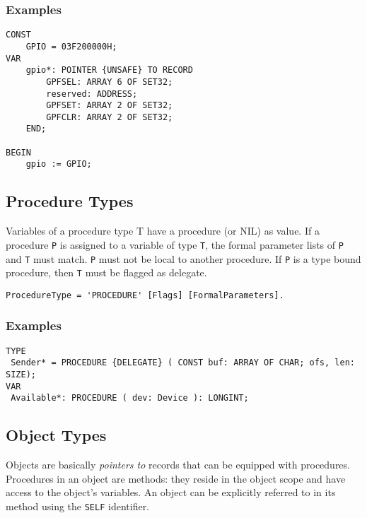 \documentclass[a4wide,11pt]{article}
\begin{document}
\begin{annotation}
\subsubsection{Examples}
\begin{lstlisting}[style=example]
CONST
	GPIO = 03F200000H;
VAR
	gpio*: POINTER {UNSAFE} TO RECORD
		GPFSEL: ARRAY 6 OF SET32;
		reserved: ADDRESS;
		GPFSET: ARRAY 2 OF SET32;
		GPFCLR: ARRAY 2 OF SET32;
	END;

BEGIN
	gpio := GPIO;
\end{lstlisting}
\end{annotation}

\subsection{Procedure Types}

Variables of a procedure type T have a procedure (or NIL) as value.
If a procedure \verb"P" is assigned to a variable of type \verb"T", the formal parameter lists of \verb"P" and \verb"T" must match. \verb"P" must not be local to another procedure.
If \verb"P" is a type bound procedure, then \verb"T" must be flagged as delegate.

\begin{lstlisting}[style=ebnf]
ProcedureType = 'PROCEDURE' [Flags] [FormalParameters].
\end{lstlisting}

\begin{annotation}
\subsubsection{Examples}
\begin{lstlisting}[style=example]
TYPE
 Sender* = PROCEDURE {DELEGATE} ( CONST buf: ARRAY OF CHAR; ofs, len: SIZE);
VAR
 Available*: PROCEDURE ( dev: Device ): LONGINT;
\end{lstlisting}
\end{annotation}

\subsection{Object Types}

Objects are basically \emph{pointers to} records that can be equipped with procedures.
Procedures in an object are methods: they reside in the object scope and have access to the object's variables.
An object can be explicitly referred to in its method using the \lstinline"SELF" identifier.
\end{document}
